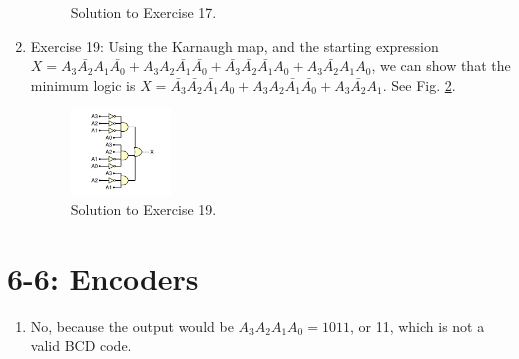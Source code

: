 \documentclass[10pt]{article}
\begin{document}
\begin{enumerate}
\begin{figure}
\caption{\label{fig:wave3} Solution to Exercise 17.}
\end{figure}
\item Exercise 19: Using the Karnaugh map, and the starting expression $X = A_3 \bar{A_2} A_1 \bar{A_0} + A_3 A_2 \bar{A_1} \bar{A_0} + \bar{A_3} \bar{A_2} \bar{A_1} A_0 + A_3 \bar{A_2} A_1 A_0$, we can show that the minimum logic is $X = \bar{A_3} \bar{A_2} \bar{A_1} A_0 + A_3 A_2 \bar{A_1} \bar{A_0} + A_3 \bar{A_2} A_1$.  See Fig. \ref{fig:wave4}.
\begin{figure}
\centering
\includegraphics[width=0.25\textwidth]{code/hmk5_6-5-19.pdf}
\caption{\label{fig:wave4} Solution to Exercise 19.}
\end{figure}
\end{enumerate}

\section{6-6: Encoders}

\begin{enumerate}
\item No, because the output would be $A_3 A_2 A_1 A_0 = 1011$, or 11, which is not a valid BCD code.
\end{enumerate}
\end{document}
